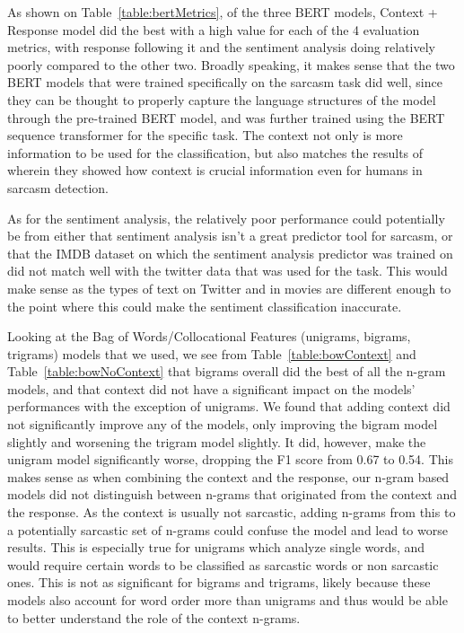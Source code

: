 \documentclass[11pt,a4paper]{article}
\begin{document}
As shown on Table~\ref{table:bertMetrics}, of the three BERT models,
Context + Response model did the best with a high value for each of the 4 evaluation metrics, with response following it and the sentiment analysis doing relatively poorly compared to the
other two. Broadly speaking, it makes sense that the two BERT models that were trained specifically on the sarcasm task did well, since they can be thought to properly capture the
language structures of the model through the pre-trained BERT model, and was further trained using the BERT sequence transformer for the specific task. The context not only is more
information to be used for the classification, but also matches the results of \cite{Wallace2014HumansRC} wherein they showed how context is crucial information even for humans in
sarcasm detection.

As for the sentiment analysis, the relatively poor performance could potentially be from either that sentiment analysis isn’t a great predictor tool for sarcasm,
or that the IMDB dataset on which the sentiment analysis predictor was trained on did not match well with the twitter data that was used for the task. This would make sense as the
types of text on Twitter and in movies are different enough to the point where this could make the sentiment classification inaccurate.
\par Looking at the Bag of Words/Collocational Features (unigrams, bigrams, trigrams) models that we used, we see from Table~\ref{table:bowContext} and Table~\ref{table:bowNoContext}
that bigrams overall did the best of all the n-gram models, and that context did not have a significant impact on the models' performances with the exception of unigrams. We found that adding context did not significantly improve any of the models, only improving the bigram model slightly and worsening the trigram model slightly. It did, however, make the unigram model significantly worse, dropping the F1 score from 0.67 to 0.54. This makes
sense as when combining the context and the response, our n-gram based models did not distinguish between n-grams that originated from the context and the response. As the context
is usually not sarcastic, adding n-grams from this to a potentially sarcastic set of n-grams could confuse the model and lead to worse results. This is especially true for unigrams
which analyze single words, and would require certain words to be classified as sarcastic words or non sarcastic ones. This is not as significant for bigrams and trigrams, likely
because these models also account for word order more than unigrams and thus would be able to better understand the role of the context n-grams. 
\end{document}
